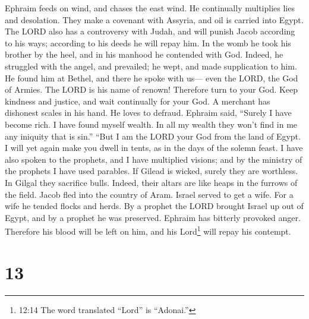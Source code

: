  Ephraim feeds on wind, and chases the east wind. He
continually multiplies lies and desolation. They make a covenant with
Assyria, and oil is carried into Egypt.  The LORD also has a
controversy with Judah, and will punish Jacob according to his ways;
according to his deeds he will repay him.  In the womb he
took his brother by the heel, and in his manhood he contended with God.
 Indeed, he struggled with the angel, and prevailed; he
wept, and made supplication to him. He found him at Bethel, and there he
spoke with us---  even the LORD, the God of Armies. The LORD
is his name of renown!  Therefore turn to your God. Keep
kindness and justice, and wait continually for your God.  A
merchant has dishonest scales in his hand. He loves to defraud.
 Ephraim said, ``Surely I have become rich. I have found
myself wealth. In all my wealth they won't find in me any iniquity that
is sin.''  ``But I am the LORD your God from the land of
Egypt. I will yet again make you dwell in tents, as in the days of the
solemn feast.  I have also spoken to the prophets, and I
have multiplied visions; and by the ministry of the prophets I have used
parables.  If Gilead is wicked, surely they are worthless.
In Gilgal they sacrifice bulls. Indeed, their altars are like heaps in
the furrows of the field.  Jacob fled into the country of
Aram. Israel served to get a wife. For a wife he tended flocks and
herds.  By a prophet the LORD brought Israel up out of
Egypt, and by a prophet he was preserved.  Ephraim has
bitterly provoked anger. Therefore his blood will be left on him, and
his Lord\footnote{12:14 The word translated ``Lord'' is ``Adonai.''}
will repay his contempt.

\hypertarget{section-7}{%
\section{13}\label{section-7}}

